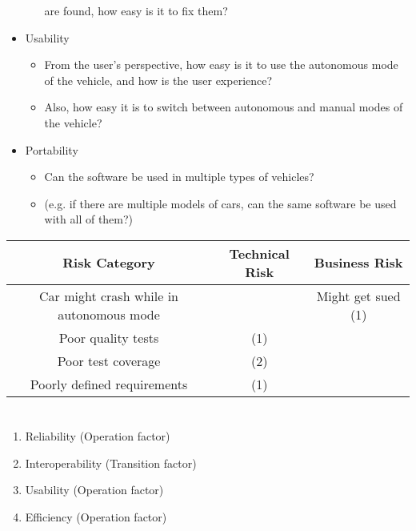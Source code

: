 \documentclass[letterpaper]{article}
\begin{document}
\begin{itemize}
\begin{itemize}
		are found, how easy is it to fix them?
	\end{itemize}
	\item Usability
	\begin{itemize}	
	\item From the user's perspective, how easy is it to use the autonomous mode of the vehicle, and how is the user experience?
		\item Also, how easy it is to switch between autonomous and manual modes of the vehicle?
	\end{itemize}
	\item Portability
	\begin{itemize}	
	\item Can the software be used in multiple types of vehicles? 
		\item (e.g. if there are multiple models of cars, can the same software be used with all of them?)
	\end{itemize}
\end{itemize}

\begin{table}[H]
\centering
\begin{tabular}{c|c|c|}
Risk Category & Technical Risk & Business Risk \\ \hline
Car might crash while in autonomous mode &  & Might get sued (1)  \\ \hline
Poor quality tests & (1)  &  \\ \hline
Poor test coverage & (2) &  \\ \hline
Poorly defined requirements & (1) & \\ \hline
\end{tabular}
\end{table}

\section{}

\begin{enumerate}
	\item Reliability (Operation factor)
	\item Interoperability (Transition factor)
	\item Usability (Operation factor)
	\item Efficiency (Operation factor)
\end{enumerate}

\section{}
\end{document}
